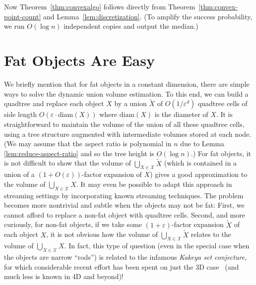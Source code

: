 \documentclass[11pt]{article}
\newcommand{\eps}{\varepsilon}
\newcommand{\class}[1]{\mathcal{#1}}
\begin{document}
%
Now Theorem~\ref{thm:convexalgo} follows directly from Theorem~\ref{thm:convex-point-count} and Lemma~\ref{lem:discretization}. (To amplify the success probability, we run $O(\log n)$ independent copies and output the median.)
%
%
\appendix
%
\section{Fat Objects Are Easy}
\label{sec:fat}
%
We briefly mention that for fat objects in a constant dimension, there are simple ways to solve the dynamic union volume estimation. To this end, we can build a quadtree and replace each object $X$ by a union $\widetilde{X}$ of $O(1/\eps^d)$ quadtree cells of side length $O(\eps \cdot \mathrm{diam}(X))$ where $\mathrm{diam}(X)$ is the diameter of $X$.  It is straightforward to maintain the volume of the union of all these quadtree cells, using a tree structure augmented with intermediate volumes stored at each node. (We may assume that the aspect ratio is polynomial in $n$ due to Lemma \ref{lem:reduce-aspect-ratio} and so the tree height is $O(\log n)$.)
%
For fat objects, it is not difficult to show that the volume of $\bigcup_{X\in \class{X}} \widetilde{X}$ (which is contained in a union of a $(1+O(\eps))$-factor expansion of $X$) gives a good approximation to the volume of $\bigcup_{X \in \class{X}} X$.
It may even be possible to adapt this approach in streaming settings by incorporating known streaming techniques.  
%
The problem becomes more nontrivial and subtle when the objects may not be fat: First, we cannot afford to replace a non-fat object with quadtree cells. Second, and more curiously, for non-fat objects, if we take some $(1+\eps)$-factor expansion $\widetilde{X}$ of each object $X$, it is not obvious how the volume of $\bigcup_{X\in \class{X}}\widetilde{X}$ relates to the volume of $\bigcup_{X\in \class{X}} X$.  In fact, this type of question (even in the special case when the objects are narrow ``rods'') is related to the infamous \emph{Kakeya set conjecture}, for which considerable recent effort has been spent on just the 3D case~\cite{WangZ25} (and much less is known in 4D and beyond)!
%
\end{document}
